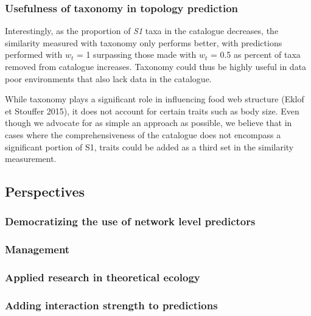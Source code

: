 \documentclass[letterpaper]{article}
\begin{document}
\subsubsection{Usefulness of taxonomy in topology prediction}

 Interestingly, as the proportion of \textit{S1} taxa in the catalogue decreases, the similarity measured with taxonomy only performs better, with predictions performed with $w_t$ = 1 surpassing those made with $w_t$ = 0.5 as percent of taxa removed from catalogue increases. Taxonomy could thus be highly useful in data poor environments that also lack data in the catalogue.

While taxonomy plays a significant role in influencing food web structure (Eklof et Stouffer 2015), it does not account for certain traits such as body size. Even though we advocate for as simple an approach as possible, we believe that in cases where the comprehensiveness of the catalogue does not encompass a significant portion of S1, traits could be added as a third set in the similarity measurement.





\subsection{Perspectives}
\subsubsection{Democratizing the use of network level predictors}
\subsubsection{Management}
\subsubsection{Applied research in theoretical ecology}
\subsubsection{Adding interaction strength to predictions}
\end{document}
